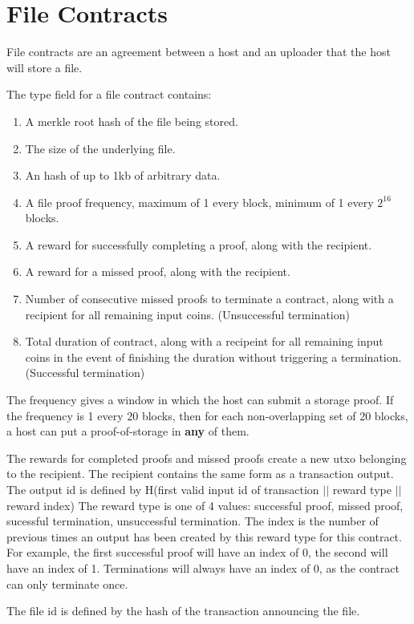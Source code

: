 \documentclass[twocolumn]{article}
\begin{document}
\section{File Contracts}
File contracts are an agreement between a host and an uploader that the host will store a file.

The type field for a file contract contains:
\begin{enumerate}
	\item A merkle root hash of the file being stored.
	\item The size of the underlying file.
	\item An hash of up to 1kb of arbitrary data.
	\item A file proof frequency, maximum of 1 every block, minimum of 1 every $2^16$ blocks.
	\item A reward for successfully completing a proof, along with the recipient.
	\item A reward for a missed proof, along with the recipient.
	\item Number of consecutive missed proofs to terminate a contract, along with a recipient for all remaining input coins. (Unsuccessful termination)
	\item Total duration of contract, along with a recipeint for all remaining input coins in the event of finishing the duration without triggering a termination. (Successful termination)
\end{enumerate}

The frequency gives a window in which the host can submit a storage proof.
If the frequency is 1 every 20 blocks, then for each non-overlapping set of 20 blocks, a host can put a proof-of-storage in \textbf{any} of them.

The rewards for completed proofs and missed proofs create a new utxo belonging to the recipient.
The recipient contains the same form as a transaction output.
The output id is defined by H(first valid input id of transaction $||$ reward type $||$ reward index)
The reward type is one of 4 values: successful proof, missed proof, sucessful termination, unsuccessful termination.
The index is the number of previous times an output has been created by this reward type for this contract.
For example, the first successful proof will have an index of 0, the second will have an index of 1.
Terminations will always have an index of 0, as the contract can only terminate once.

The file id is defined by the hash of the transaction announcing the file.
\end{document}
